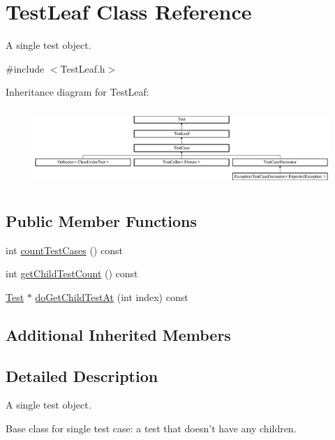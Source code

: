 \hypertarget{class_test_leaf}{\section{Test\-Leaf Class Reference}
\label{class_test_leaf}
}


A single test object.  




{\ttfamily \#include $<$Test\-Leaf.\-h$>$}

Inheritance diagram for Test\-Leaf\-:\begin{figure}[H]
\begin{center}
\leavevmode
\includegraphics[height=2.962963cm]{class_test_leaf}
\end{center}
\end{figure}
\subsection*{Public Member Functions}
\begin{DoxyCompactItemize}
\item 
int \hyperlink{class_test_leaf_aecf22f6d00f9a35d89c00c4b83e34aff}{count\-Test\-Cases} () const 
\item 
int \hyperlink{class_test_leaf_a74463f8aa3dae0f727f26a184233749a}{get\-Child\-Test\-Count} () const 
\item 
\hyperlink{class_test}{Test} $\ast$ \hyperlink{class_test_leaf_ac6c850de11b23821255839205fb319d5}{do\-Get\-Child\-Test\-At} (int index) const 
\end{DoxyCompactItemize}
\subsection*{Additional Inherited Members}


\subsection{Detailed Description}
A single test object. 

Base class for single test case\-: a test that doesn't have any children. 


